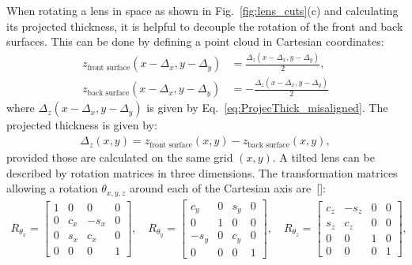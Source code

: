 \begin{refsection}
When rotating a lens in space as shown in Fig.~\ref{fig:lens_cuts}(c) and calculating its projected thickness, it is helpful to decouple the rotation of the front and back surfaces. This can be done by defining a point cloud in Cartesian coordinates:
\begin{subequations}\label{eq:point_cloud}
    \begin{align}
    z_\text{front surface}(x-\Delta_x,y-\Delta_y) &=\frac{\Delta_z(x-\Delta_x,y-\Delta_y)}{2},\\
    z_\text{back surface}(x-\Delta_x,y-\Delta_y) &= -\frac{\Delta_z(x-\Delta_x,y-\Delta_y)}{2}
    \end{align}
\end{subequations}{}
where $\Delta_z(x-\Delta_x,y-\Delta_y)$ is given by Eq.~\ref{eq:ProjecThick_misaligned}. The projected thickness is given by:
\begin{align}\label{eq:point_cloud_thickness}
    \Delta_z(x,y) = z_\text{front surface}(x,y) - z_\text{back surface}(x,y),
\end{align}{}
provided those are calculated on the same grid $(x,y)$. A tilted lens can be described by rotation matrices in three dimensions. The transformation matrices allowing a rotation $\theta_{x,y,z}$ around each of the Cartesian axis are~[\cite{House2016}]:
\begin{align}\label{eq:affine}
    R_{\theta_x}= \begin{bmatrix}
                        1 & 0 & 0 &0\\
                        0 & c_x & -s_x  &0\\
                        0 & s_x & c_x &0\\
                        0 & 0 & 0 &1
    \end{bmatrix} ,\quad
    R_{\theta_y} = \begin{bmatrix}
                    c_y & 0 & s_y &0\\
                    0 & 1 & 0 &0\\
                    -s_y & 0 & c_y &0\\
                    0 & 0 & 0 &1
    \end{bmatrix}  ,\quad
    R_{\theta_z} = \begin{bmatrix}
                    c_z & -s_z & 0 &0\\
                    s_z & c_z & 0 &0\\
                    0 & 0 & 1 &0\\
                    0 & 0 & 0 &1
    \end{bmatrix},

\end{align}
\end{refsection}
